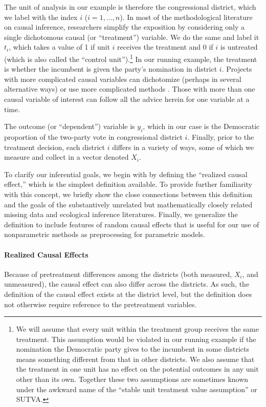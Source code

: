 \documentclass[11pt,titlepage]{article}
\begin{document}
The unit of analysis in our example is therefore the congressional
district, which we label with the index $i$ ($i=1,\dots,n$).  In most
of the methodological literature on causal inference, researchers
simplify the exposition by considering only a single dichotomous
causal (or ``treatment'') variable.  We do the same and label it
$t_i$, which takes a value of 1 if unit $i$ receives the treatment and
0 if $i$ is untreated (which is also called the ``control
unit'').\footnote{We will assume that every unit within the treatment
  group receives the same treatment.  This assumption would be
  violated in our running example if the nomination the Democratic
  party gives to the incumbent in some districts means something
  different from that in other districts.  We also assume that the
  treatment in one unit has no effect on the potential outcomes in any
  unit other than its own.  Together these two assumptions are
  sometimes known under the awkward name of the ``stable unit
  treatment value assumption'' or SUTVA.}  In our running example, the
treatment is whether the incumbent is given the party's nomination in
district $i$.  Projects with more complicated causal variables can
dichotomize (perhaps in several alternative ways) or use more
complicated methods \citep{ImaDyk03}.  Those with more than one causal
variable of interest can follow all the advice herein for one variable
at a time.

The outcome (or ``dependent'') variable is $y_i$, which in our case is
the Democratic proportion of the two-party vote in congressional
district $i$.  Finally, prior to the treatment decision, each district
$i$ differs in a variety of ways, some of which we measure and collect
in a vector denoted $X_i$.

To clarify our inferential goals, we begin with by defining the
``realized causal effect,'' which is the simplest definition
available.  To provide further familiarity with this concept, we
briefly show the close connections between this definition and the
goals of the substantively unrelated but mathematically closely
related missing data and ecological inference literatures.  Finally,
we generalize the definition to include features of random causal
effects that is useful for our use of nonparametric methods as
preprocessing for parametric models.

\paragraph{Realized Causal Effects}
Because of pretreatment differences among the districts (both
measured, $X_i$, and unmeasured), the causal effect can also differ
across the districts.  As such, the definition of the causal effect
exists at the district level, but the definition does not otherwise
require reference to the pretreatment variables.
\end{document}
